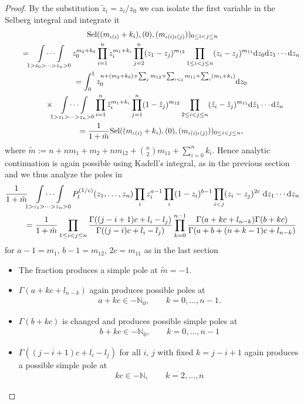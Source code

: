 \documentclass[10pt,a4paper]{amsart}
\numberwithin{equation}{section}
\newcommand{\N}{\mathbb{N}}
\renewcommand{\d}{\mathrm{d}}
\newcommand{\Sel}{\mathrm{Sel}}
\begin{document}
\begin{proof}By the substitution $\tilde{z}_i=z_i/z_0$ we can isolate the first variable in the Selberg integral and integrate it
\begin{gather*}
 \Sel((m_{\iota(i)}+k_i),(0), (m_{\iota(i)\iota(j)}))_{0\leq i<j\leq n}\\
\qquad{} =\idotsint\limits_{1> z_0>\cdots >z_n> 0} z_0^{m_2+k_0} \prod_{i=1}^n z_i^{m_1+k_i} \prod_{j=2}^{n} (z_1 - z_j)^{m_{12}} \prod\limits_{1 \leq i < j \leq n} (z_i - z_j)^{m_{11}}  \d z_0 \d z_1 \cdots \d z_n\\
\qquad{} =\int_0^1 z_0^{n+(m_2+k_0) + \sum_j m_{12} + \sum_{i<j} m_{11} + \sum_i (m_1+k_i)} \d z_0\\
\qquad\quad{}\times  \idotsint\limits_{1> z_1>\cdots >z_n > 0} \prod_{i=1}^n \tilde{z}_i^{m_1+k_i} \prod_{j=1}^{n} (1 - \tilde{z}_j)^{m_{12}} \prod_{2 \leq i < j \leq n} (\tilde{z}_i - \tilde{z}_j)^{m_{11}}  \d\tilde{z}_1 \cdots \d\tilde{z}_n\\
\qquad{} =\frac{1}{1+\tilde{m}}
  \Sel((m_{\iota(i)}+k_i),(0), (m_{\iota(i)\iota(j)}))_{0\leq i<j\leq n},
\end{gather*} 	
where $\tilde{m}:=n+ nm_1+m_2 + nm_{12} + {n\choose 2} m_{11}+\sum_{i=0}^n k_i$. Hence analytic continuation is again possible using Kadell's integral, as in the previous section and we thus analyze the poles in
\begin{gather*}
 \frac{1}{1+\tilde{m}}\idotsint\displaylimits_{1> z_1>\dots >z_{n}> 0}
P_{l}^{(1/c)}(z_1,\dots, z_n)\prod_i z_i^{a-1}\prod_i (1-z_i)^{b-1}\prod_{i<j} (z_i-z_j)^{2c} \;\d z_1\cdots \d z_{n}\\
\qquad{} =\frac{1}{1+\tilde{m}}\prod_{1\leq i<j\leq n}\frac{\Gamma((j-i+1)c+l_i-l_j)}
{\Gamma((j-i)c+l_i-l_j)}
\prod_{k=0}^{n-1}
\frac{\Gamma(a+kc+l_{n-k})\Gamma(b+kc)}
{\Gamma(a+b+(n+k-1)c+l_{n-k})}
\end{gather*}
for $a-1=m_1$, $b-1=m_{12}$, $2c=m_{11}$ as in the last section
	\begin{itemize}\itemsep=0pt
	\item The fraction produces a simple pole at $\tilde{m}=-1$.
	\item $\Gamma(a+kc+l_{n-k})$ again produces possible poles at
	\begin{gather*}
	a+ k c  \in -\N_0,  \qquad k=0,\dots,n-1.
	\end{gather*}
	\item $\Gamma(b+kc)$ is changed and produces possible simple poles at
	\begin{gather*}
	b+kc  \in -\N_0,  \qquad k=0,\dots,n-1
	\end{gather*}
	\item $\Gamma((j-i+1)c+l_i-l_j)$ for all $i$, $j$ with fixed $k=j-i+1$ again produces a possible simple pole at
	\begin{gather*}
	kc  \in -\N,  \qquad k=2,\dots,n\tag*{\qed}
	\end{gather*}
\end{itemize}\renewcommand{\qed}{} 	
\end{proof}
\end{document}
